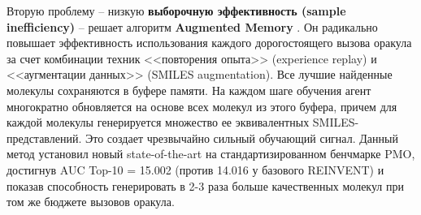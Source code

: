 Вторую проблему -- низкую \textbf{выборочную эффективность (sample inefficiency)} -- решает алгоритм \textbf{Augmented Memory} \cite{guo2024augmented}. Он радикально повышает эффективность использования каждого дорогостоящего вызова оракула за счет комбинации техник <<повторения опыта>> (experience replay) и <<аугментации данных>> (SMILES augmentation). Все лучшие найденные молекулы сохраняются в буфере памяти. На каждом шаге обучения агент многократно обновляется на основе всех молекул из этого буфера, причем для каждой молекулы генерируется множество ее эквивалентных SMILES-представлений. Это создает чрезвычайно сильный обучающий сигнал. Данный метод установил новый state-of-the-art на стандартизированном бенчмарке PMO, достигнув AUC Top-10 = 15.002 (против 14.016 у базового REINVENT) и показав способность генерировать в 2-3 раза больше качественных молекул при том же бюджете вызовов оракула.
